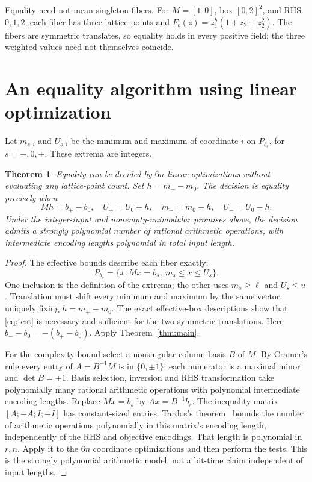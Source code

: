 \documentclass[11pt]{article}
\newtheorem{theorem}{Theorem}[section]
\begin{document}
Equality need not mean singleton fibers. For \(M=[1\ \ 0]\), box \([0,2]^2\), and RHS \(0,1,2\), each fiber has three lattice points and
\(F_b(z)=z_1^b(1+z_2+z_2^2)\). The fibers are symmetric translates, so equality holds in every positive field; the three weighted values need not themselves coincide.

\section{An equality algorithm using linear optimization}
Let \(m_{s,i}\) and \(U_{s,i}\) be the minimum and maximum of coordinate \(i\) on \(P_{b_s}\), for \(s=-,0,+\). These extrema are integers.

\begin{theorem}\label{thm:alg}
Equality can be decided by \(6n\) linear optimizations without evaluating any lattice-point count. Set \(h=m_+-m_0\). The decision is equality precisely when
\begin{equation}\label{eq:test}
Mh=b_+-b_0,\quad U_+=U_0+h,\quad
m_-=m_0-h,\quad U_-=U_0-h.
\end{equation}
Under the integer-input and nonempty-unimodular promises above, the decision admits a strongly polynomial number of rational arithmetic operations, with intermediate encoding lengths polynomial in total input length.
\end{theorem}
\begin{proof}
The effective bounds describe each fiber exactly:
\[
P_{b_s}=\{x:Mx=b_s,\ m_s\le x\le U_s\}.
\]
One inclusion is the definition of the extrema; the other uses \(m_s\ge\ell\) and \(U_s\le u\).
Translation must shift every minimum and maximum by the same vector, uniquely fixing \(h=m_+-m_0\). The exact effective-box descriptions show that \eqref{eq:test} is necessary and sufficient for the two symmetric translations. Here \(b_--b_0=-(b_+-b_0)\).
Apply Theorem~\ref{thm:main}.

For the complexity bound select a nonsingular column basis \(B\) of \(M\). By Cramer's rule every entry of \(A=B^{-1}M\) is in \(\{0,\pm1\}\): each numerator is a maximal minor and \(\det B=\pm1\). Basis selection, inversion and RHS transformation take polynomially many rational arithmetic operations with polynomial intermediate encoding lengths.
Replace \(Mx=b_s\) by \(Ax=B^{-1}b_s\).
The inequality matrix \([A;-A;I;-I]\) has constant-sized entries. Tardos's theorem~\cite{Tardos} bounds the number of arithmetic operations polynomially in this matrix's encoding length, independently of the RHS and objective encodings. That length is polynomial in \(r,n\). Apply it to the \(6n\) coordinate optimizations and then perform the tests. This is the strongly polynomial arithmetic model, not a bit-time claim independent of input lengths.
\end{proof}
\end{document}

